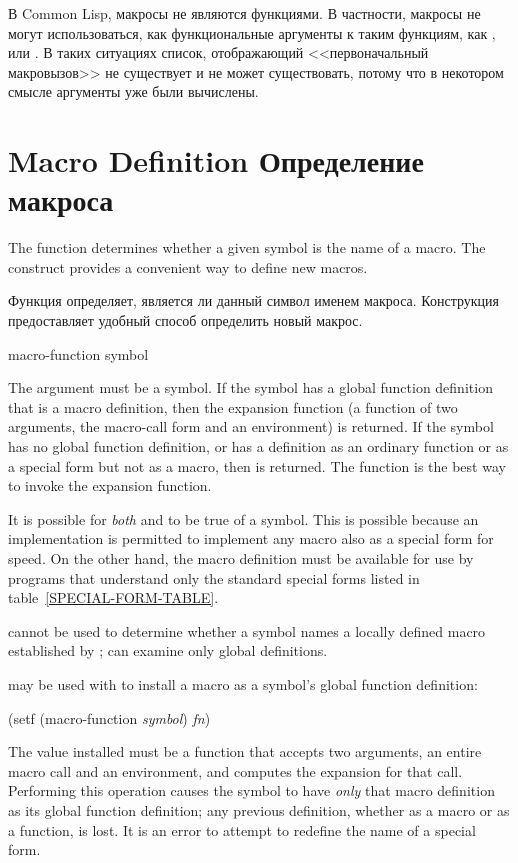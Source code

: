 В Common Lisp, макросы не являются функциями.
В частности, макросы не могут использоваться, как функциональные аргументы к
таким функциям, как ,  или . В таких ситуациях
список, отображающий <<первоначальный макровызов>> не существует и не может
существовать, потому что в некотором смысле аргументы уже были вычислены.


\section{Macro Definition Определение макроса}

The function  determines whether a given symbol
is the name of a macro.  The  construct provides
a convenient way to define new macros.

Функция  определяет, является ли данный символ именем
макроса. Конструкция  предоставляет удобный способ определить
новый макрос.

\begin{obsolete}
\begin{defun}[Function]
macro-function symbol

The argument must be a symbol.  If the symbol has a global function definition
that is a macro definition, then the expansion function
(a function of two arguments, the macro-call form and an environment)
is returned.
If the symbol has no global function definition, or has a definition
as an ordinary function or as a special form but not as a macro, then
{\false} is returned.  The function 
is the best way to invoke the expansion function.

It is possible for \emph{both}  and 
to be true of a symbol.  This is possible because an implementation is
permitted to implement any macro also as a special form for speed.
On the other hand, the macro definition must be available
for use by programs that understand only the standard special forms
listed in table~\ref{SPECIAL-FORM-TABLE}.

 cannot be used to determine whether a symbol names
a locally defined macro established by ;
 can
examine only global definitions.

 may be used with  to install
a macro as a symbol's global function definition:
\begin{lisp}
(setf (macro-function \emph{symbol}) \emph{fn})
\end{lisp}
The value installed must be a function that accepts two arguments,
an entire macro call and an environment, and computes the expansion for that call.
Performing this operation causes the symbol to have \emph{only} that
macro definition as its global function definition; any previous
definition, whether as a macro or as a function, is lost.
It is an error to attempt to redefine the name of a special
form.
\end{defun}
\end{obsolete}

